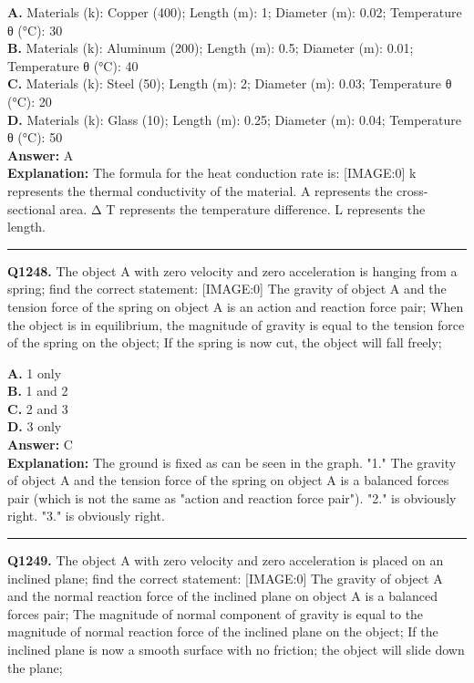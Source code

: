 \documentclass[12pt]{article}
\begin{document}
\textbf{A.} Materials (k): Copper (400); Length (m): 1;
Diameter (m): 0.02; Temperature θ (°C): 30 \\
\textbf{B.} Materials (k): Aluminum (200); Length (m): 0.5;
Diameter (m): 0.01; Temperature θ (°C): 40 \\
\textbf{C.} Materials (k): Steel (50); Length (m): 2;
Diameter (m): 0.03; Temperature θ (°C): 20 \\
\textbf{D.} Materials (k): Glass (10); Length (m): 0.25;
Diameter (m): 0.04; Temperature θ (°C): 50 \\

\textbf{Answer:} A \\
\textbf{Explanation:} The formula for the heat conduction rate is:
[IMAGE:0]
k represents the thermal conductivity of the material.
A represents the cross-sectional area.
Δ
T represents the temperature difference.
L represents the length.

\hrule
\vspace{1em}


\noindent
\textbf{Q1248.} The object A with zero velocity and zero acceleration is hanging from a spring; find the correct statement:
[IMAGE:0]
The gravity of object A and the tension force of the spring on object A is an action and reaction force pair;
When the object is in equilibrium, the magnitude of gravity is equal to the tension force of the spring on the object;
If the spring is now cut, the object will fall freely;



\textbf{A.} 1 only \\
\textbf{B.} 1 and 2 \\
\textbf{C.} 2 and 3 \\
\textbf{D.} 3 only \\

\textbf{Answer:} C \\
\textbf{Explanation:} The ground is fixed as can be seen in the graph. "1." The gravity of object A and the tension force of the spring on object A is a balanced forces pair (which is not the same as "action and reaction force pair"). "2." is obviously right. "3." is obviously right.

\hrule
\vspace{1em}


\noindent
\textbf{Q1249.} The object A with zero velocity and zero acceleration is placed on an inclined plane; find the correct statement:
[IMAGE:0]
The gravity of object A and the normal reaction force of the inclined plane on object A is a balanced forces pair;
The magnitude of normal component of gravity is equal to the magnitude of normal reaction force of the inclined plane on the object;
If the inclined plane is now a smooth surface with no friction; the object will slide down the plane;
\end{document}
